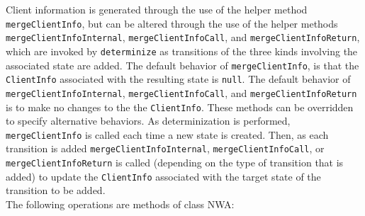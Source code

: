 \documentclass{llncs}
\begin{document}
Client information is generated through the use of the helper method \texttt{mergeClientInfo}, but can be altered through the use of the helper methods \texttt{mergeClientInfoInternal}, \texttt{mergeClientInfoCall}, and \texttt{mergeClientInfoReturn}, which are invoked by \texttt{determinize} as transitions of the three kinds involving the associated state are added.  The default behavior of \texttt{mergeClientInfo}, is that the \texttt{ClientInfo} associated with the resulting state is \texttt{null}.  The default behavior of \texttt{mergeClientInfoInternal}, \texttt{mergeClientInfoCall}, and \texttt{mergeClientInfoReturn} is to make no changes to the the \texttt{ClientInfo}.  These methods can be overridden to specify alternative behaviors.  As determinization is performed, \texttt{mergeClientInfo} is called each time a new state is created.  Then, as each transition is added \texttt{mergeClientInfoInternal}, \texttt{mergeClientInfoCall}, or \texttt{mergeClientInfoReturn} is called (depending on the type of transition that is added) to update the \texttt{ClientInfo} associated with the target state of the transition to be added. \\

\noindent The following operations are methods of class NWA:
\end{document}
